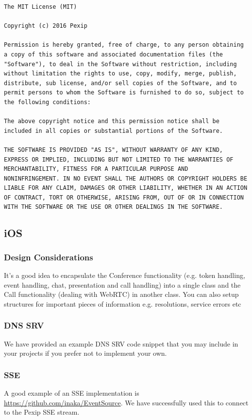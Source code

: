 \documentclass[a4paper,11pt]{article}
\begin{document}
\begin{verbatim}
The MIT License (MIT)

Copyright (c) 2016 Pexip

Permission is hereby granted, free of charge, to any person obtaining
a copy of this software and associated documentation files (the
"Software"), to deal in the Software without restriction, including
without limitation the rights to use, copy, modify, merge, publish,
distribute, sub license, and/or sell copies of the Software, and to
permit persons to whom the Software is furnished to do so, subject to
the following conditions:

The above copyright notice and this permission notice shall be
included in all copies or substantial portions of the Software.

THE SOFTWARE IS PROVIDED "AS IS", WITHOUT WARRANTY OF ANY KIND,
EXPRESS OR IMPLIED, INCLUDING BUT NOT LIMITED TO THE WARRANTIES OF
MERCHANTABILITY, FITNESS FOR A PARTICULAR PURPOSE AND
NONINFRINGEMENT. IN NO EVENT SHALL THE AUTHORS OR COPYRIGHT HOLDERS BE
LIABLE FOR ANY CLAIM, DAMAGES OR OTHER LIABILITY, WHETHER IN AN ACTION
OF CONTRACT, TORT OR OTHERWISE, ARISING FROM, OUT OF OR IN CONNECTION
WITH THE SOFTWARE OR THE USE OR OTHER DEALINGS IN THE SOFTWARE.
\end{verbatim}

\subsection{iOS}
\label{sec:orgheadline58}
\subsubsection{Design Considerations}
\label{sec:orgheadline53}
\label{orgtarget1}
It's a good idea to encapsulate the Conference functionality
(e.g. token handling, event handling, chat, presentation and call
handling) into a single class and the Call functionality (dealing with
WebRTC) in another class.  You can also setup structures for important
pieces of information e.g. resolutions, service errors etc

\subsubsection{DNS SRV}
\label{sec:orgheadline54}
\label{orgtarget3}
We have provided an example DNS SRV code snippet that you may include
in your projects if you prefer not to implement your own.

\subsubsection{SSE}
\label{sec:orgheadline55}
A good example of an SSE implementation is
\url{https://github.com/inaka/EventSource}.  We have successfully used this
to connect to the Pexip SSE stream.
\end{document}
